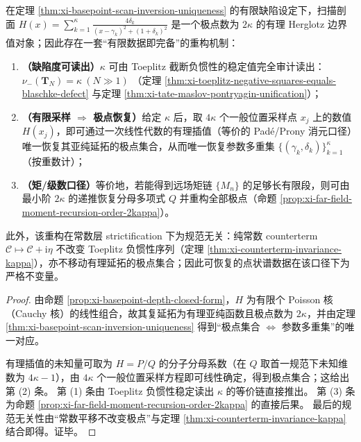 \begin{corollary}\label{cor:xi-finite-defect-complete-reconstruction}
在定理 \ref{thm:xi-basepoint-scan-inversion-uniqueness} 的有限缺陷设定下，扫描剖面
\(
H(x)=\sum_{k=1}^{\kappa}\frac{4\delta_k}{(x-\gamma_k)^2+(1+\delta_k)^2}
\)
是一个极点数为 \(2\kappa\) 的有理 Herglotz 边界值对象；因此存在一套“有限数据即完备”的重构机制：
\begin{enumerate}
  \item \textbf{（缺陷度可读出）}\(\kappa\) 可由 Toeplitz 截断负惯性的稳定值完全审计读出：
  \(
  \nu_-(\mathbf{T}_N)=\kappa\ (N\gg 1)
  \)
  （定理 \ref{thm:xi-toeplitz-negative-squares-equals-blaschke-defect} 与定理 \ref{thm:xi-tate-maslov-pontryagin-unification}）；
  \item \textbf{（有限采样 \(\Rightarrow\) 极点恢复）}给定 \(\kappa\) 后，取 \(4\kappa\) 个一般位置采样点 \(x_j\) 上的数值 \(H(x_j)\)，即可通过一次线性代数的有理插值（等价的 Pad\'e/Prony 消元口径）唯一恢复其亚纯延拓的极点集合，从而唯一恢复参数多重集 \(\{(\gamma_k,\delta_k)\}_{k=1}^{\kappa}\)（按重数计）；
  \item \textbf{（矩/级数口径）}等价地，若能得到远场矩链 \(\{M_n\}\) 的足够长有限段，则可由最小阶 \(2\kappa\) 的递推恢复分母多项式 \(Q\) 并重构全部极点（命题 \ref{prop:xi-far-field-moment-recursion-order-2kappa}）。
\end{enumerate}
此外，该重构在常数层 strictification 下为规范无关：纯常数 counterterm \(\mathscr{C}\mapsto \mathscr{C}+\mathrm{i}\eta\) 不改变 Toeplitz 负惯性序列（定理 \ref{thm:xi-counterterm-invariance-kappa}），亦不移动有理延拓的极点集合；因此可恢复的点状谱数据在该口径下为严格不变量。
\end{corollary}
\begin{proof}
由命题 \ref{prop:xi-basepoint-depth-closed-form}，\(H\) 为有限个 Poisson 核（Cauchy 核）的线性组合，故其复延拓为有理亚纯函数且极点数为 \(2\kappa\)，并由定理 \ref{thm:xi-basepoint-scan-inversion-uniqueness} 得到“极点集合 \(\Longleftrightarrow\) 参数多重集”的唯一对应。
\par
有理插值的未知量可取为 \(H=P/Q\) 的分子分母系数（在 \(Q\) 取首一规范下未知维数为 \(4\kappa-1\)），由 \(4\kappa\) 个一般位置采样方程即可线性确定，得到极点集合；这给出第 (2) 条。
第 (1) 条由 Toeplitz 负惯性稳定读出 \(\kappa\) 的等价链直接推出。
第 (3) 条为命题 \ref{prop:xi-far-field-moment-recursion-order-2kappa} 的直接后果。
最后的规范无关性由“常数平移不改变极点”与定理 \ref{thm:xi-counterterm-invariance-kappa} 结合即得。证毕。
\end{proof}
